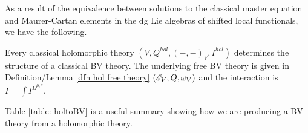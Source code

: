 \documentclass[10pt]{amsart}
\def\brian{\textcolor{blue}{BW: }\textcolor{blue}}
\begin{document}
As a result of the equivalence between solutions to the classical master equation and Maurer-Cartan elements in the dg Lie algebras of shifted local functionals, we have the following. 

\begin{prop} Every classical holomorphic theory $(V, Q^{hol},(-,-)_V, I^{hol})$ determines the structure of a classical BV theory.
The underlying free BV theory is given in Definition/Lemma \ref{dfn hol free theory} $(\mathscr E_V, Q, \omega_V)$ and the interaction is $I = \int I^{\Omega^{0,*}}$. 
\end{prop}

%


Table \ref{table: holtoBV} is a useful summary showing how we are producing a BV theory from a holomorphic theory.
\end{document}

